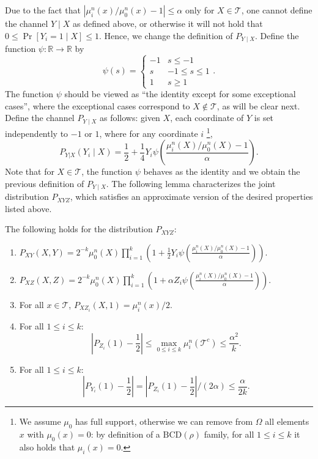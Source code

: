 \documentclass[final, 12pt]{colt2018}
\providecommand{\BCD}{\mathrm{BCD}}
\begin{document}
Due to the fact that $\left| \mu^n_i(x)/ \mu_0^n(x) - 1\right| \le \alpha$ only for $X \in \mathcal{T}$, one cannot define the channel $Y \mid X$ as defined above, or otherwise it will not hold that $0 \le \Pr[Y_i=1 \mid X] \le 1$. Hence, we change the definition of $P_{Y\mid X}$. Define the function $\psi  \colon \mathbb{R} \to \mathbb{R}$ by
\begin{equation} \label{eq:psi}
\psi(s) = \begin{cases}
-1 		& s \le -1 \\
s		& -1 \le s \le 1 \\
1		& s \ge 1
\end{cases}.
\end{equation}
The function $\psi$ should be viewed as ``the identity except for some exceptional cases'', where the exceptional cases correspond to $X \notin \mathcal{T}$, as will be clear next. Define the channel $P_{Y \mid X}$ as follows: given $X$, each coordinate of $Y$ is set independently to $-1$ or $1$, where for any coordinate $i$ \footnote{We assume $\mu_0$ has full support, otherwise we can remove from $\Omega$ all elements $x$ with $\mu_0(x) = 0$: by definition of a $\BCD(\rho)$ family, for all $1\le i \le k$ it also holds that $\mu_i(x)=0$.},
\begin{equation} \label{eq:9}
P_{Y|X}(Y_i \mid X) = \frac{1}{2} + \frac{1}{4} Y_i \psi\left(\frac{\mu^n_i(X) / \mu^n_0(X) - 1}{\alpha}\right).
\end{equation}
Note that for $X \in \mathcal{T}$, the function $\psi$ behaves as the identity and we obtain the previous definition of $P_{Y\mid X}$.
The following lemma characterizes the joint distribution $P_{XYZ}$, which satisfies an approximate version of the desired properties listed above.

\begin{lemma} \label{lem:bias}
The following holds for the distribution $P_{XYZ}$:
\begin{enumerate}
\item $ P_{XY}(X,Y) = 2^{-k} \mu^n_0(X) \prod_{i=1}^k \left( 1 + \frac{1}{2} Y_i \psi\left(\frac{\mu^n_i(X) / \mu^n_0(X) - 1}{\alpha}\right) \right)$.
\label{itm:bias1}
\item $ P_{XZ}(X,Z) = 2^{-k} \mu^n_0(X) \prod_{i=1}^k \left( 1 + \alpha Z_i \psi\left(\frac{\mu^n_i(X) / \mu^n_0(X) - 1}{\alpha}\right) \right)$.
\label{itm:bias2}
\item For all $x \in \mathcal{T}$, $P_{XZ_i}(X,1) = \mu^n_i(x)/2$. \label{itm:bias3}
\item For all $1 \le i \le k$:
\[ 
\left\lvert P_{Z_i}(1) - \frac{1}{2} \right\rvert 
\le \max_{0 \le i \le k} \mu_i^n(\mathcal{T}^c)
\le \frac{\alpha^2}{k}.
\]
\label{itm:bias4}
\item For all $1 \le i \le k$:
\[  \left\lvert P_{Y_i}(1) - \frac{1}{2} \right\rvert 
= \left\lvert P_{Z_i}(1) - \frac{1}{2} \right\rvert / (2 \alpha)
\le \frac{\alpha}{2k}.\]
\label{itm:bias5}
\end{enumerate}
\end{lemma}
\end{document}
